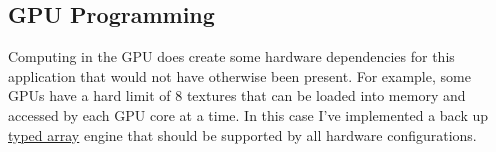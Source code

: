 {\subsection{GPU Programming}

Computing in the GPU does create some hardware dependencies for this application that would not have otherwise been present.  For example, some GPUs have a hard limit of 8 textures that can be loaded into memory and accessed by each GPU core at a time.  In this case I've implemented a back up \href{https://developer.mozilla.org/en-US/docs/Web/JavaScript/Typed_arrays}{typed array} engine that should be supported by all hardware configurations.

}
